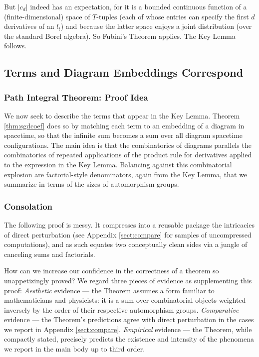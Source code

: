 \documentclass{article}
\theoremstyle{plain}
\theoremstyle{definition}
\newcommand{\wabs}[1]{\left|#1\right|}
\begin{document}
            But $\wabs{c_d}$ indeed has an expectation, for it is a bounded
            continuous function of a (finite-dimensional) space of $T$-tuples
            (each of whose entries can specify the first $d$ derivatives of an
            $l_t$) and because the latter space enjoys a joint distribution
            (over the standard Borel algebra).  So Fubini's Theorem applies.
            The Key Lemma follows.   

    \subsection{Terms and Diagram Embeddings Correspond}
        \subsubsection*{Path Integral Theorem: Proof Idea}
            We now seek to describe the terms that appear in the Key Lemma. 
            Theorem \ref{thm:sgdcoef} does so by matching each term to an
            embedding of a diagram in spacetime, so that the infinite sum
            becomes a sum over all diagram spacetime configurations.
            The main idea is that the combinatorics of diagrams parallels the
            combinatorics of repeated applications of the product rule for
            derivatives applied to the expression in the Key Lemma. 
            Balancing against this combinatorial explosion are factorial-style 
            denominators, again from the Key Lemma, that we summarize in terms
            of the sizes of automorphism groups.

        \subsubsection*{Consolation}
            The following proof is messy.  It compresses into a reusable
            package the intricacies of direct perturbation (see Appendix
            \ref{sect:compare} for samples of uncompressed computations), and
            as such equates two conceptually clean sides via a jungle of
            canceling sums and factorials.  

            How can we increase our confidence in the correctness of a theorem
            so unappetizingly proved?  We regard three pieces of evidence as
            supplementing this proof: \emph{Aesthetic} evidence --- the Theorem
            assumes a form familiar to mathematicians and physicists: it is a
            sum over combinatorial objects weighted inversely by the order of
            their respective automorphism groups.  \emph{Comparative}
            evidence --- the Theorem's predictions agree with direct
            perturbation in the cases we report in Appendix \ref{sect:compare}.
            \emph{Empirical} evidence --- the Theorem, while compactly stated,
            precisely predicts the existence and intensity of the phenomena we
            report in the main body up to third order.
 
\end{document}
